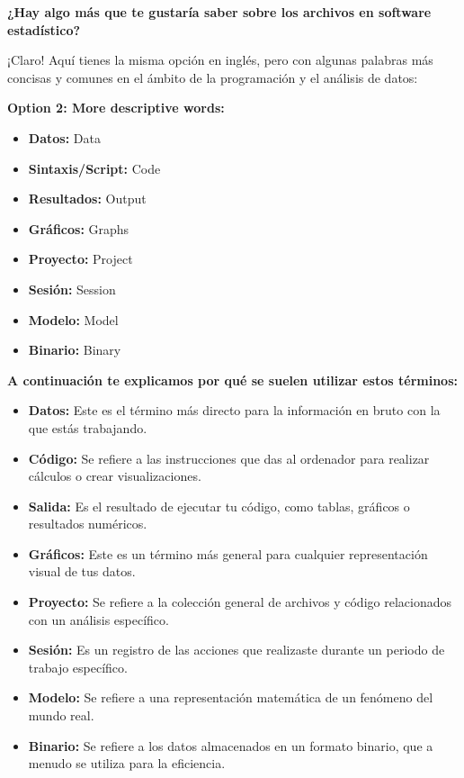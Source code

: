 \documentclass[
  stu,
  floatsintext,
  longtable,
  a4paper,
  nolmodern,
  notxfonts,
  notimes,
  colorlinks=true,linkcolor=blue,citecolor=blue,urlcolor=blue]{apa7}
\providecommand{\tightlist}{%
  \setlength{\itemsep}{0pt}\setlength{\parskip}{0pt}}
\begin{document}
\textbf{¿Hay algo más que te gustaría saber sobre los archivos en
software estadístico?}

¡Claro! Aquí tienes la misma opción en inglés, pero con algunas palabras
más concisas y comunes en el ámbito de la programación y el análisis de
datos:

\textbf{Option 2: More descriptive words:}

\begin{itemize}
\tightlist
\item
  \textbf{Datos:} Data
\item
  \textbf{Sintaxis/Script:} Code
\item
  \textbf{Resultados:} Output
\item
  \textbf{Gráficos:} Graphs
\item
  \textbf{Proyecto:} Project
\item
  \textbf{Sesión:} Session
\item
  \textbf{Modelo:} Model
\item
  \textbf{Binario:} Binary
\end{itemize}

\textbf{A continuación te explicamos por qué se suelen utilizar estos
términos:}

\begin{itemize}
\tightlist
\item
  \textbf{Datos:} Este es el término más directo para la información en
  bruto con la que estás trabajando.
\item
  \textbf{Código:} Se refiere a las instrucciones que das al ordenador
  para realizar cálculos o crear visualizaciones.
\item
  \textbf{Salida:} Es el resultado de ejecutar tu código, como tablas,
  gráficos o resultados numéricos.
\item
  \textbf{Gráficos:} Este es un término más general para cualquier
  representación visual de tus datos.
\item
  \textbf{Proyecto:} Se refiere a la colección general de archivos y
  código relacionados con un análisis específico.
\item
  \textbf{Sesión:} Es un registro de las acciones que realizaste durante
  un periodo de trabajo específico.
\item
  \textbf{Modelo:} Se refiere a una representación matemática de un
  fenómeno del mundo real.
\item
  \textbf{Binario:} Se refiere a los datos almacenados en un formato
  binario, que a menudo se utiliza para la eficiencia.
\end{itemize}
\end{document}
